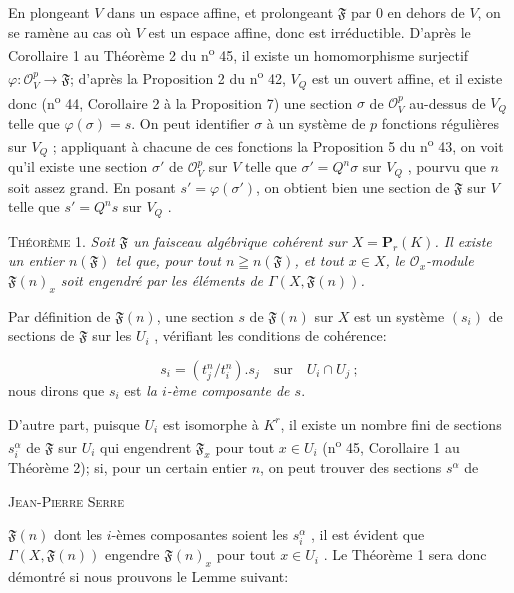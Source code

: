 En plongeant $V$ dans un espace affine, et prolongeant $\mathfrak{F}$ par 0 en dehors de $V$, on se ramène au cas où $V$ est un espace affine, donc est irréductible. D'après le Corollaire 1 au Théorème 2 du n\textsuperscript{o} 45, il existe un homomorphisme surjectif $\varphi: \mathcal{O}_V^p \longrightarrow \mathfrak{F}$; d'après la Proposition 2 du n\textsuperscript{o} 42, $V_Q$ est un ouvert affine, et il existe donc (n\textsuperscript{o} 44, Corollaire 2 à la Proposition 7) une section $\sigma$ de $\mathcal{O}_V^p$ au-dessus de $V_Q$ telle que $\varphi(\sigma) = s$. On peut identifier $\sigma$ à un système de $p$ fonctions régulières sur $V_Q$ ; appliquant à chacune de ces fonctions la Proposition 5 du n\textsuperscript{o} 43, on voit qu'il existe une section $\sigma'$ de $\mathcal{O}_V^p$ sur $V$ telle que $\sigma' = Q^n \sigma$ sur $V_Q$ , pourvu que $n$ soit assez grand. En posant $s' = \varphi(\sigma')$, on obtient bien une section de $\mathfrak{F}$ sur $V$ telle que $s' = Q^n s$ sur $V_Q$ .

\textsc{Théorème} 1. \textit{Soit $\mathfrak{F}$ un faisceau algébrique cohérent sur $X = \mathbf{P}_r(K)$. Il existe un entier $n(\mathfrak{F})$ tel que, pour tout $n \geqq n(\mathfrak{F})$, et tout $x \in X$, le $\mathcal{O}_x$-module $\mathfrak{F}(n)_x$ soit engendré par les éléments de $\Gamma(X, \mathfrak{F}(n))$.}

Par définition de $\mathfrak{F}(n)$, une section $s$ de $\mathfrak{F}(n)$ sur $X$ est un système $(s_i)$ de sections de $\mathfrak{F}$ sur les $U_i$ , vérifiant les conditions de cohérence:

\begin{equation*}
s_i = (t_j^n/t_i^n).s_j \quad \mathrm{sur} \quad U_i \cap U_j \ ;
\end{equation*}
nous dirons que $s_i$ est \textit{la $i$-ème composante de $s$}.

D'autre part, puisque $U_i$ est isomorphe à $K^r$, il existe un nombre fini de sections $s_i^\alpha$ de $\mathfrak{F}$ sur $U_i$ qui engendrent $\mathfrak{F}_x$ pour tout $x \in U_i$ (n\textsuperscript{o} 45, Corollaire 1 au Théorème 2); si, pour un certain entier $n$, on peut trouver des sections $s^\alpha$ de




\textsc{Jean-Pierre Serre}

 $\mathfrak{F}(n)$ dont les $i$-èmes composantes soient les $s_i^\alpha$ , il est évident que $\Gamma(X, \mathfrak{F}(n))$ engendre $\mathfrak{F}(n)_x$ pour tout $x \in U_i$ . Le Théorème 1 sera donc démontré si nous prouvons le Lemme suivant:

